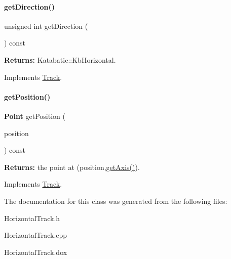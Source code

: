 \mbox{\label{classKite_1_1HorizontalTrack_a0dd7cf705ace42c662c289955313b2e9}} 
\paragraph{\texorpdfstring{get\+Direction()}{getDirection()}}
{\footnotesize\ttfamily unsigned int get\+Direction (\begin{DoxyParamCaption}{ }\end{DoxyParamCaption}) const\hspace{0.3cm}{\ttfamily [virtual]}}

{\bfseries Returns\+:} Katabatic\+::\+Kb\+Horizontal. 

Implements \hyperlink{classKite_1_1Track_ae35b78590ed6aa546b626ef95f28c533}{Track}.

\mbox{\label{classKite_1_1HorizontalTrack_a6ab4f8026e4500918aa8721f1199f8b6}} 
\paragraph{\texorpdfstring{get\+Position()}{getPosition()}}
{\footnotesize\ttfamily \textbf{ Point} get\+Position (\begin{DoxyParamCaption}\item[{\textbf{ Db\+U\+::\+Unit}}]{position }\end{DoxyParamCaption}) const\hspace{0.3cm}{\ttfamily [virtual]}}

{\bfseries Returns\+:} the point at {\ttfamily }(position,\hyperlink{classKite_1_1Track_ab5b5aaa5b318369feee6003dbad039c2}{get\+Axis()}). 

Implements \hyperlink{classKite_1_1Track_a2a033f90e528d3d07aa33694dd733200}{Track}.



The documentation for this class was generated from the following files\+:\begin{DoxyCompactItemize}
\item 
Horizontal\+Track.\+h\item 
Horizontal\+Track.\+cpp\item 
Horizontal\+Track.\+dox\end{DoxyCompactItemize}
